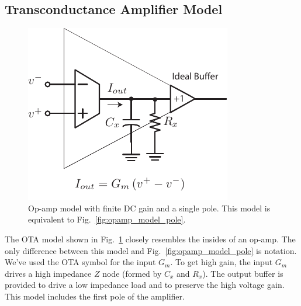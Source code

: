 \subsection{Transconductance Amplifier Model}
\begin{figure}[tb]
\centering
\includegraphics[width=.5\columnwidth]{opamp_ota_model_gain}
\caption{Op-amp model with finite DC gain and a single pole. This model is equivalent to Fig.~\ref{fig:opamp_model_pole}.}
\label{fig:opamp_ota_model_gain}
\end{figure}

The OTA model shown in Fig.~\ref{fig:opamp_ota_model_gain} closely resembles the insides of an op-amp.  The only difference between this model and Fig.~\ref{fig:opamp_model_pole} is notation.  We've used the OTA symbol for the input $G_m$.  To get high gain, the input $G_m$ drives a high impedance $Z$ node (formed by $C_x$ and $R_x$). The output buffer is provided to drive a low impedance load and to preserve the high voltage gain.  This model includes the first pole of the amplifier.
%
%
